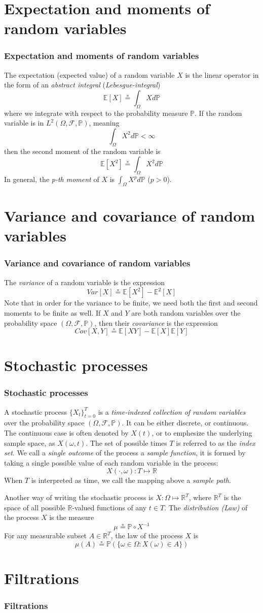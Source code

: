 \documentclass[xcolor=dvipsnames]{beamer}
\begin{document}
\section{Expectation and moments of random variables}
\begin{frame}
\frametitle{Expectation and moments of random variables}
The expectation (expected value) of a random variable $X$ is the linear operator in the form of an \emph{abstract integral} (\emph{Lebesgue-integral})
\[
	\mathbb{E}[X] \circeq \int_{\Omega}{Xd\mathbb{P}}
\]
where we integrate with respect to the probability measure $\mathbb{P}$.
If the random variable is in $L^2(\Omega, \mathcal{F}, \mathbb{P})$, meaning
\[
	\int_{\Omega}{X^2d\mathbb{P}} < \infty
\]
then the second moment of the random variable is
\[
	\mathbb{E}[X^2] \circeq \int_{\Omega}{X^2d\mathbb{P}}
\]
In general, the \emph{p-th moment} of $X$ is $\int_{\Omega}{X^pd\mathbb{P}}$ ($p>0$).
\end{frame}
\section{Variance and covariance of random variables}
\begin{frame}
\frametitle{Variance and covariance of random variables}
The \emph{variance} of a random variable is the expression
\[
	Var[X] \circeq \mathbb{E}[X^2] - \mathbb{E}^2[X]
\]
Note that in order for the variance to be finite, we need both the first and second moments to be finite as well. If $X$ and $Y$ are both random variables over the probability space $(\Omega, \mathcal{F}, \mathbb{P})$, then their \emph{covariance} is the expression
\[
	Cov[X,Y] \circeq \mathbb{E}[XY] - \mathbb{E}[X]\mathbb{E}[Y]
\]
\end{frame}
\section{Stochastic processes}
\begin{frame}
\frametitle{Stochastic processes}
A stochastic process $\{X_t\}_{t=0}^{T}$ is a \emph{time-indexed collection of random variables} over the probability space $(\Omega, \mathcal{F}, \mathbb{P})$. It can be either discrete, or continuous. The continuous case is often denoted by $X(t)$, or to emphesize the underlying sample space, as $X(\omega, t)$. The set of possible times $T$ is referred to as the \emph{index set}. We call a \emph{single outcome} of the process a \emph{sample function}, it is formed by taking a single possible value of each random variable in the process:
\[
	X(\cdot, \omega) : T \mapsto \mathbb{R}
\]
When $T$ is interpreted as time, we call the mapping above a \emph{sample path}.
\end{frame}
\begin{frame}
Another way of writing the stochastic process is $X : \Omega \mapsto \mathbb{R}^T$, where $\mathbb{R}^T$ is the space of all possible $\mathbb{R}$-valued functions of any $t \in T$. The \emph{distribution (Law)} of the process $X$ is the measure
\[
	\mu \circeq \mathbb{P} \circ X^{-1}
\]
For any measurable subset $A \in \mathbb{R}^T$, the law of the process $X$ is
\[
	\mu(A) \circeq \mathbb{P}(\{\omega \in \Omega : X(\omega) \in A\})
\]
\end{frame}
\section{Filtrations}
\begin{frame}
\frametitle{Filtrations}
\end{frame}
\end{document}
